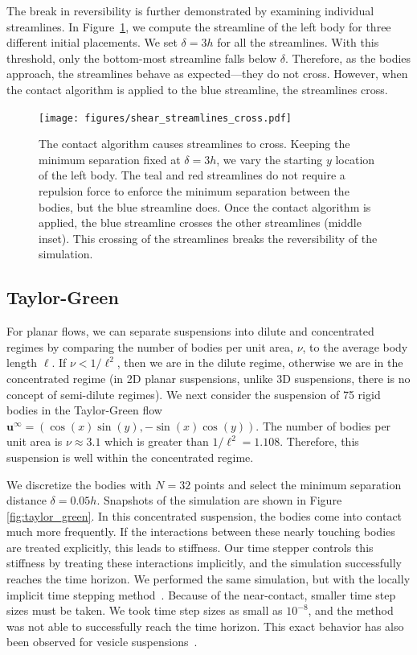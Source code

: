 \documentclass[preprint, 10pt]{elsarticle}
\begin{document}
The break in reversibility is further demonstrated by examining
individual streamlines.  In Figure~\ref{fig:shear_cross}, we compute the
streamline of the left body for three different initial placements.  We
set $\delta=3h$ for all the streamlines.  With this threshold, only the
bottom-most streamline falls below $\delta$.  Therefore, as the bodies approach, the streamlines behave as expected---they do
not cross.  However, when the contact algorithm is applied to the blue
streamline, the streamlines cross.

\begin{figure}[!h]
\begin{center}
\texttt{[image: figures/shear\_streamlines\_cross.pdf]}
\end{center}
\caption{\label{fig:shear_cross} The contact algorithm causes
streamlines to cross. Keeping the minimum separation fixed at
$\delta=3h$, we vary the starting $y$ location of the left body. The
teal and red streamlines do not require a repulsion force to enforce the
minimum separation between the bodies, but the blue streamline does.
Once the contact algorithm is applied, the blue streamline crosses the
other streamlines (middle inset). This crossing of the streamlines
breaks the reversibility of the simulation.}
\end{figure}


\subsection{Taylor-Green}

For planar flows, we can separate suspensions into dilute and
concentrated regimes by comparing the number of bodies per unit area,
$\nu$, to the average body length $\ell$. If $\nu < 1/\ell^2$, then
we are in the dilute regime, otherwise we are in the concentrated regime
(in 2D planar suspensions, unlike 3D suspensions, there is no concept of
semi-dilute regimes).  We next consider the suspension of 75 rigid
bodies in the Taylor-Green flow $\mathbf{u}^\infty = (\cos(x)\sin(y),
-\sin(x)\cos(y))$.  The number of bodies per unit area is $\nu
\approx 3.1$ which is greater than $1/\ell^2=1.108$.  Therefore, this
suspension is well within the concentrated regime. 

We discretize the bodies with $N=32$ points and select the minimum
separation distance $\delta=0.05h$. Snapshots of the simulation are
shown in Figure \ref{fig:taylor_green}.  In this concentrated
suspension, the bodies come into contact much more frequently.  If
the interactions between these nearly touching bodies are treated
explicitly, this leads to stiffness.  Our time stepper controls this
stiffness by treating these interactions implicitly, and the simulation
successfully reaches the time horizon.  We performed the same
simulation, but with the locally implicit time stepping
method~\cite{Lu2017}.  Because of the near-contact, smaller time step
sizes must be taken.  We took time step sizes as small as $10^{-8}$, and
the method was not able to successfully reach the time horizon.  This
exact behavior has also been observed for vesicle
suspensions~\cite{Quaife2014}.
\end{document}
